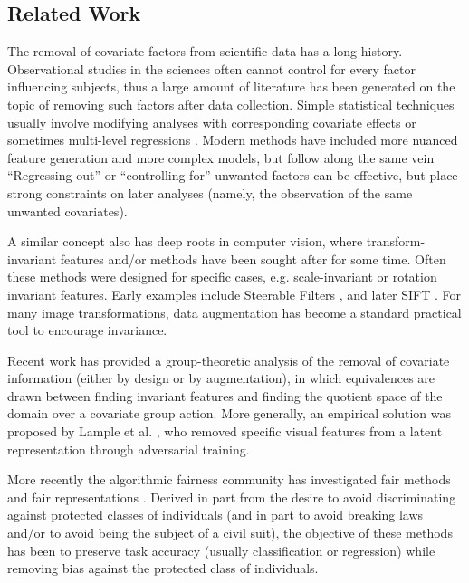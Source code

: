 \subsection{Related Work}

The removal of covariate factors from scientific data has a long history. Observational studies in the sciences often cannot control for every factor influencing subjects, thus a large amount of literature has been generated on the topic of removing such factors after data collection. Simple statistical techniques usually involve modifying analyses with corresponding covariate effects \cite{raudenbush1994random} or sometimes multi-level regressions \cite{freckleton2002misuse}. Modern methods have included more nuanced feature generation and more complex models, but follow along the same vein \cite{feis2015ica,fortin2017harmonization}
``Regressing out'' or ``controlling for'' unwanted factors can be effective, but place strong constraints on later analyses (namely, the observation of the same unwanted covariates).%

A similar concept also has deep roots in computer vision, where transform-invariant features and/or methods have been sought after for some time. Often these methods were designed for specific cases, e.g. scale-invariant or rotation invariant features. Early examples include Steerable Filters \cite{freeman1991design,greenspan1994overcomplete}, and later SIFT \cite{lowe1999object}. For many image transformations, data augmentation has become a standard practical tool to encourage invariance.  

Recent work has provided a group-theoretic \cite{cohen2016group} analysis of the removal of covariate information (either by design or by augmentation), in which equivalences are drawn between finding invariant features and finding the quotient space of the domain over a covariate group action. More generally, an empirical solution was proposed by Lample et al. \cite{lample2017fader}, who removed specific visual features from a latent representation through adversarial training. 

More recently the algorithmic fairness community has investigated fair methods \cite{kamiran2009classifying} and fair representations \cite{zemel2013learning}. Derived in part from the desire to avoid discriminating against protected classes of individuals (and in part to avoid breaking laws and/or to avoid being the subject of a civil suit), the objective of these methods has been to preserve task accuracy (usually classification or regression) while removing bias against the protected class of individuals. 

